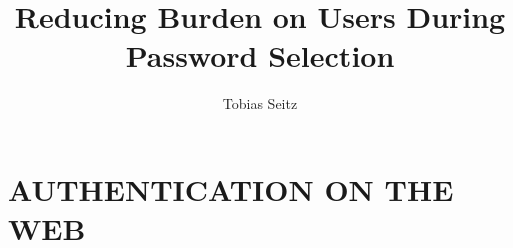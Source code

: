 \documentclass[12pt,a4paper,twoside]{book}
\begin{document}
\frontmatter
\title{Reducing Burden on Users During Password Selection}
\author{Tobias Seitz}
\maketitle


{%
\pagestyle{empty}%
\addtolength{\oddsidemargin}{11mm}
\addtolength{\evensidemargin}{11mm}
\addtolength{\topmargin}{11mm}




\setlength{\parindent}{0pt} %
\setlength{\parskip}{7pt plus 2pt minus 1pt}
  


\makeatletter
	\setlength{\cftbeforepartskip}{7ex}
	\setlength{\cftbeforechapskip}{5.5ex}
	\setlength{\cftbeforesecskip}{0.75ex}
	\setlength{\cftbeforesubsecskip}{0.1ex}
	\setlength{\cftbeforetoctitleskip}{-5mm}
	\setlength{\cftbeforeloftitleskip}{-5mm}
	\setlength{\cftbeforelottitleskip}{-5mm}
	\renewcommand{\cfttoctitlefont}{
	  \LARGE\usefont{OT1}{ptm}{b}{sc}\selectfont
	}
	\renewcommand{\cftloftitlefont}{
	  \LARGE\usefont{OT1}{ptm}{b}{sc}\selectfont
	}
	\renewcommand{\cftlottitlefont}{
	  \LARGE\usefont{OT1}{ptm}{b}{sc}\selectfont
	}
	\renewcommand{\cftpartfont}{
	  \fontsize{14}{18}\usefont{OT1}{ptm}{b}{sc}\selectfont
	}
	\renewcommand{\cftchapfont}{
	  \fontsize{13}{17}\usefont{OT1}{ptm}{b}{n}\selectfont
	}	%
	
  \setcounter{tocdepth}{2}
  \tableofcontents
\makeatother

\mainmatter


\part{AUTHENTICATION ON THE WEB}

}
\end{document}
